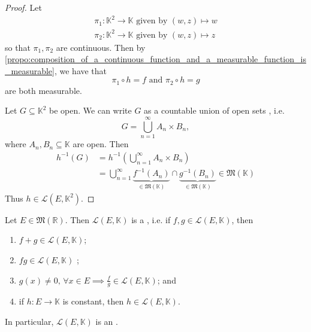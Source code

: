 \documentclass[notoc,notitlepage]{tufte-book}
\begin{document}
\begin{proof}
    Let
  \begin{gather*}
    \pi_1 : \mathbb{K}^2 \to \mathbb{K} \text{ given by } (w, z) \mapsto w \\
    \pi_2 : \mathbb{K}^2 \to \mathbb{K} \text{ given by } (w, z) \mapsto z
  \end{gather*}
  so that $\pi_1, \pi_2$ are continuous. Then by
  \cref{propo:composition_of_a_continuous_function_and_a_measurable_function_is_measurable},
  we have that
  \begin{equation*}
    \pi_1 \circ h = f \text{ and } \pi_2 \circ h = g
  \end{equation*}
  are both measurable.

  \noindent
   Let $G \subseteq \mathbb{K}^2$ be open. We can
  write $G$ as a countable union of open sets , i.e.
  \begin{equation*}
    G = \bigcup_{n=1}^{\infty} A_n \times B_n,
  \end{equation*}
  where $A_n, B_n \subseteq \mathbb{K}$ are open. Then
  \begin{align*}
    h^{-1}(G) &= h^{-1} \left( \bigcup_{n=1}^{\infty} A_n \times B_n \right) \\
              &= \bigcup_{n=1}^{\infty} \underbrace{f^{-1}(A_n)}_{\in
                \mathfrak{M}(\mathbb{K})} \cap \underbrace{g^{-1}(B_n)}_{\in
                \mathfrak{M}(\mathbb{K})} \in \mathfrak{M}(\mathbb{K})
  \end{align*}
  Thus $h \in \mathcal{L}(E, \mathbb{K}^2)$.
\end{proof}

\begin{propo}\label{propo:_l_e_k_is_a_unital_algebra}
  Let $E \in \mathfrak{M}(\mathbb{R})$. Then $\mathcal{L}(E, \mathbb{K})$ is a
  , i.e. if $f, g \in \mathcal{L}(E, \mathbb{K})$, then
  \begin{enumerate}
    \item $f + g \in \mathcal{L}(E, \mathbb{K})$;
    \item $fg \in \mathcal{L}(E, \mathbb{K})$ ;
    \item $g(x) \neq 0,\, \forall x \in E \implies \frac{f}{g} \in
      \mathcal{L}(E, \mathbb{K})$; and
    \item if $h : E \to \mathbb{K}$ is constant, then $h \in \mathcal{L}(E,
      \mathbb{K})$.
  \end{enumerate}
  In particular, $\mathcal{L}(E, \mathbb{K})$ is an .
\end{propo}
\end{document}
